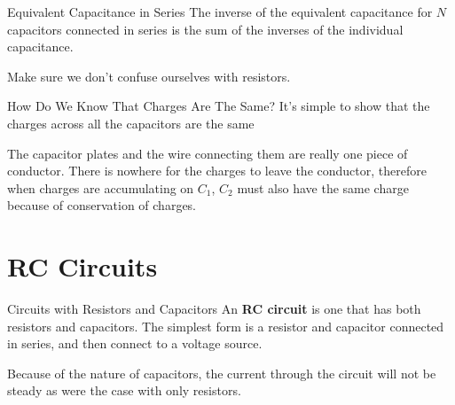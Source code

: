 \documentclass[12pt,aspectratio=169]{beamer}
\begin{document}
\begin{frame}{Equivalent Capacitance in Series}
  The inverse of the equivalent capacitance for $N$ capacitors connected in
  series is the sum of the inverses of the individual capacitance.

  
  Make sure we don't confuse ourselves with resistors.
\end{frame}



\begin{frame}{How Do We Know That Charges Are The Same?}
  It's simple to show that the charges across all the capacitors are the same
  \begin{center}
  \end{center}
  The capacitor plates and the wire connecting them are really one piece of
  conductor. There is nowhere for the charges to leave the conductor, therefore
  when charges are accumulating on $C_1$, $C_2$ must also have the same charge
  because of conservation of charges.
\end{frame}



\section{RC Circuits}

\begin{frame}{Circuits with Resistors and Capacitors}
  An \textbf{RC circuit} is one that has both resistors and capacitors. The
  simplest form is a resistor and capacitor connected in series, and then
  connect to a voltage source.
  \begin{center}
  \end{center}
  Because of the nature of capacitors, the current through the circuit will not
  be steady as were the case with only resistors.
\end{frame}
\end{document}
